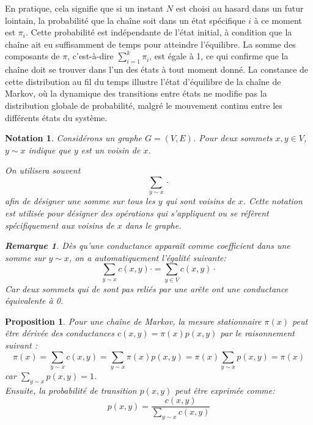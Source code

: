 \documentclass{article}
\theoremstyle{pasdepoint}
\theoremstyle{break}
\theoremstyle{pasdepoint}
\newtheorem*{remark}{Remarque}
\newtheorem*{notation}{Notation}
\newtheorem*{prop}{Proposition}
\begin{document}
En pratique, cela signifie que si un instant \(N\) est choisi au hasard dans un futur lointain, la probabilité que la chaîne soit dans un état spécifique \(i\) à ce moment est \(\pi_i\). Cette probabilité est indépendante de l'état initial, à condition que la chaîne ait eu suffisamment de temps pour atteindre l'équilibre. La somme des composants de \(\pi\), c'est-à-dire \(\sum_{i=1}^{k} \pi_i\), est égale à 1, ce qui confirme que la chaîne doit se trouver dans l'un des états à tout moment donné. La constance de cette distribution au fil du temps illustre l'état d'équilibre de la chaîne de Markov, où la dynamique des transitions entre états ne modifie pas la distribution globale de probabilité, malgré le mouvement continu entre les différents états du système.

\begin{notation}
    Considérons un graphe \( G = (V, E) \). Pour deux sommets \( x, y \in V \), \(y \sim x\) indique que \(y\) est un voisin de \(x\).
    
    On utilisera souvent
    \[
        \sum_{y \sim x}\cdot
    \]
    afin de désigner une somme sur tous les \(y\) qui sont voisins de \(x\). Cette notation est utilisée pour désigner des opérations qui s'appliquent ou se réfèrent spécifiquement aux voisins de \( x \) dans le graphe.

    \begin{remark}
        Dès qu'une conductance apparaît comme coefficient dans une somme sur $y \sim x$, on a automatiquement l'égalité suivante:
        \[\sum_{y \sim x}c(x,y)\cdot = \sum_{y \in V}c(x,y)\cdot\]
        Car deux sommets qui de sont pas reliés par une arête ont une conductance équivalente à 0.
    \end{remark}
\end{notation}

\begin{prop}
    Pour une chaîne de Markov, la mesure stationnaire \(\pi(x)\) peut être dérivée des conductances \(c(x, y) = \pi(x)p(x, y)\) par le raisonnement suivant :
\[
\pi(x) = \sum_{y \sim x} c(x, y) = \sum_{y \sim x} \pi(x)p(x, y) = \pi(x) \sum_{y \sim x} p(x, y) = \pi(x)
\]
car \(\sum_{y \sim x} p(x, y) = 1\).\\

Ensuite, la probabilité de transition \(p(x, y)\) peut être exprimée comme:
\[
p(x, y) = \frac{c(x, y)}{\sum_{y \sim x} c(x, y)}
\]
\end{prop}
\end{document}
